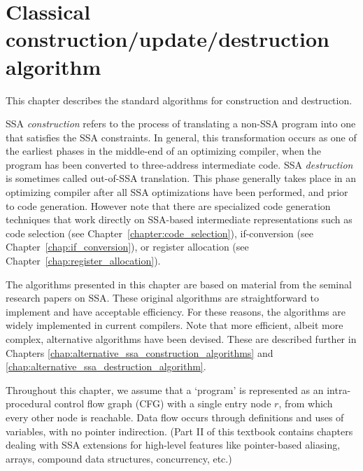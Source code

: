 \chapter{Classical construction/update/destruction algorithm }
\label{chap:classical_construction}

\graphicspath{{Figures/}{classical_construction_algorithm/Figures/}{part1/classical_construction_algorithm/Figures/}}


\def\phiops{$\phi$-functions}
\def\phiop{$\phi$-function}


This chapter describes the standard algorithms for construction and
destruction.

SSA \emph{construction} refers to the process of translating a non-SSA program into
one that satisfies the SSA constraints. In general, this transformation
occurs as one of the
earliest phases in the middle-end of an optimizing compiler, when the program
has been converted to three-address intermediate code.
SSA \emph{destruction} is sometimes called out-of-SSA translation. This phase
generally
takes place in an optimizing compiler after all SSA optimizations have
been performed, and prior to code generation. However note that there are
specialized code generation techniques that work directly on SSA-based
intermediate representations such as code selection (see Chapter~\ref{chapter:code_selection}), if-conversion (see Chapter~\ref{chap:if_conversion}), or register allocation (see Chapter~\ref{chap:register_allocation}).

The algorithms presented in this chapter are
based on material from the seminal research papers on SSA.
These original algorithms are 
straightforward to implement and have acceptable efficiency.
For these reasons, the algorithms
are widely implemented in current compilers.
Note that more
efficient, albeit more complex, alternative algorithms have been devised.
These are described further in Chapters 
\ref{chap:alternative_ssa_construction_algorithms}
and
\ref{chap:alternative_ssa_destruction_algorithm}.

Throughout this chapter,
we assume that a `program' is represented as an
intra-procedural control flow graph (CFG)
with a single entry node $r$, from which every other
node is reachable.
Data flow occurs through definitions and uses of 
variables, with no pointer indirection.
(Part II of this textbook contains chapters dealing with
SSA extensions for high-level features like
pointer-based aliasing, arrays, compound data structures, concurrency, etc.)

